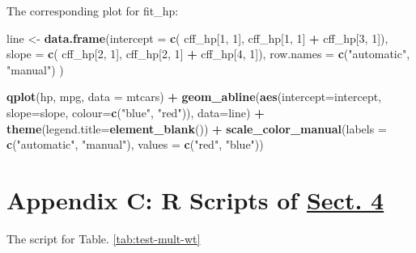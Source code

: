 \documentclass[]{article}
\newenvironment{Shaded}{\begin{snugshade}}{\end{snugshade}}
\newcommand{\KeywordTok}[1]{\textcolor[rgb]{0.13,0.29,0.53}{\textbf{#1}}}
\newcommand{\DataTypeTok}[1]{\textcolor[rgb]{0.13,0.29,0.53}{#1}}
\newcommand{\DecValTok}[1]{\textcolor[rgb]{0.00,0.00,0.81}{#1}}
\newcommand{\StringTok}[1]{\textcolor[rgb]{0.31,0.60,0.02}{#1}}
\newcommand{\OperatorTok}[1]{\textcolor[rgb]{0.81,0.36,0.00}{\textbf{#1}}}
\newcommand{\NormalTok}[1]{#1}
\begin{document}
The corresponding plot for fit\_hp:

\begin{Shaded}
\begin{Highlighting}[]
\NormalTok{line <-}\StringTok{ }\KeywordTok{data.frame}\NormalTok{(}\DataTypeTok{intercept =} \KeywordTok{c}\NormalTok{( cff_hp[}\DecValTok{1}\NormalTok{, }\DecValTok{1}\NormalTok{], cff_hp[}\DecValTok{1}\NormalTok{, }\DecValTok{1}\NormalTok{] }\OperatorTok{+}\StringTok{ }\NormalTok{cff_hp[}\DecValTok{3}\NormalTok{, }\DecValTok{1}\NormalTok{]),}
                   \DataTypeTok{slope =} \KeywordTok{c}\NormalTok{( cff_hp[}\DecValTok{2}\NormalTok{, }\DecValTok{1}\NormalTok{], cff_hp[}\DecValTok{2}\NormalTok{, }\DecValTok{1}\NormalTok{] }\OperatorTok{+}\StringTok{ }\NormalTok{cff_hp[}\DecValTok{4}\NormalTok{, }\DecValTok{1}\NormalTok{]), }
                   \DataTypeTok{row.names =} \KeywordTok{c}\NormalTok{(}\StringTok{"automatic"}\NormalTok{, }\StringTok{"manual"}\NormalTok{) )}

\KeywordTok{qplot}\NormalTok{(hp, mpg, }\DataTypeTok{data =}\NormalTok{ mtcars) }\OperatorTok{+}
\StringTok{        }\KeywordTok{geom_abline}\NormalTok{(}\KeywordTok{aes}\NormalTok{(}\DataTypeTok{intercept=}\NormalTok{intercept, }\DataTypeTok{slope=}\NormalTok{slope,}
                        \DataTypeTok{colour=}\KeywordTok{c}\NormalTok{(}\StringTok{"blue"}\NormalTok{, }\StringTok{"red"}\NormalTok{)), }\DataTypeTok{data=}\NormalTok{line) }\OperatorTok{+}\StringTok{ }
\StringTok{        }\KeywordTok{theme}\NormalTok{(}\DataTypeTok{legend.title=}\KeywordTok{element_blank}\NormalTok{()) }\OperatorTok{+}
\StringTok{        }\KeywordTok{scale_color_manual}\NormalTok{(}\DataTypeTok{labels =} \KeywordTok{c}\NormalTok{(}\StringTok{"automatic"}\NormalTok{, }\StringTok{"manual"}\NormalTok{), }\DataTypeTok{values =} \KeywordTok{c}\NormalTok{(}\StringTok{"red"}\NormalTok{, }\StringTok{"blue"}\NormalTok{))}
\end{Highlighting}
\end{Shaded}

\hypertarget{app-code-4}{\section*{\texorpdfstring{Appendix C: R Scripts
of \protect\hyperlink{sec-mult}{Sect.
4}}{Appendix C: R Scripts of Sect. 4}}\label{app-code-4}}

The script for Table. \ref{tab:test-mult-wt}
\end{document}
